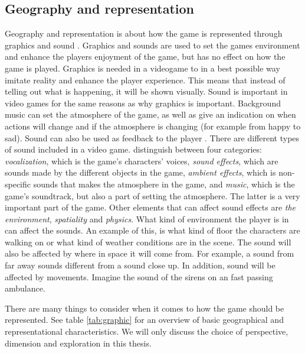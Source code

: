 \subsection{Geography and representation}
Geography and representation is about how the game is represented through graphics and sound \cite{understandingvg}. Graphics and sounds are used to set the games environment and enhance the players enjoyment of the game, but has no effect on how the game is played. Graphics is needed in a videogame to in a best possible way imitate reality and enhance the player experience. This means that instead of telling out what is happening, it will be shown visually. Sound is important in video games for the same reasons as why graphics is important. Background music can set the atmosphere of the game, as well as give an indication on when actions will change and if the atmosphere is changing (for example from happy to sad). Sound can also be used as feedback to the player \cite{umlapproach}. There are different types of sound included in a  video game. \cite{understandingvg} distinguish between four categories:
\emph{vocalization}, which is the game’s characters’ voices,
\emph{sound effects}, which are sounds made by the different objects in the game, \emph{ambient effects}, which is non-specific sounds that makes the atmosphere in the game, and \emph{music}, which is the game’s soundtrack, but also a part of setting the atmosphere. The latter is a very important part of the game. Other elements that can affect sound effects are \emph{the environment}, \emph{spatiality} and \emph{physics}. What kind of environment the player is in can affect the  sounds. An example of this, is what kind of floor the characters are walking on or what kind of weather conditions are in the scene. The sound will also be affected by where in space it will come from. For example, a sound from far away sounds different from a sound close up. In addition, sound will be affected by movements. Imagine the sound of the sirens on an fast passing ambulance.

There are many things to consider when it comes to how the game should be represented. See table \ref{tab:graphic} for an overview of basic geographical and representational characteristics. We will only discuss the choice of perspective, dimension and exploration in this thesis. 

